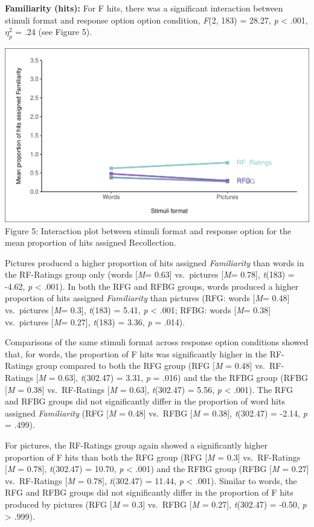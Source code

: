 \documentclass[
  11pt,
]{article}
\begin{document}
\textbf{Familiarity (hits):} For F hits, there was a significant
interaction between stimuli format and response option option condition,
\emph{F}(2, 183) = 28.27, \emph{p} \textless{} .001, \(\eta^2_p\) = .24
(see Figure 5).

\includegraphics{R--Thesis_files/figure-latex/unnamed-chunk-14-1.pdf}
Figure 5: Interaction plot between stimuli format and response option
for the mean proportion of hits assigned Recollection.

Pictures produced a higher proportion of hits assigned
\emph{Familiarity} than words in the RF-Ratings group only (words
{[}\emph{M}= 0.63{]} vs.~pictures {[}\emph{M}= 0.78{]}, \emph{t}(183) =
-4.62, \emph{p} \textless{} .001). In both the RFG and RFBG groups,
words produced a higher proportion of hits assigned \emph{Familiarity}
than pictures (RFG: words {[}\emph{M}= 0.48{]} vs.~pictures {[}\emph{M}=
0.3{]}, \emph{t}(183) = 5.41, \emph{p} \textless{} .001; RFBG: words
{[}\emph{M}= 0.38{]} vs.~pictures {[}\emph{M}= 0.27{]}, \emph{t}(183) =
3.36, \emph{p} = .014).

Comparisons of the same stimuli format across response option conditions
showed that, for words, the proportion of F hits was significantly
higher in the RF-Ratings group compared to both the RFG group (RFG
{[}\emph{M} = 0.48{]} vs.~RF-Ratings {[}\emph{M} = 0.63{]},
\emph{t}(302.47) = 3.31, \emph{p} = .016) and the the RFBG group (RFBG
{[}\emph{M} = 0.38{]} vs.~RF-Ratings {[}\emph{M} = 0.63{]},
\emph{t}(302.47) = 5.56, \emph{p} \textless{} .001). The RFG and RFBG
groups did not significantly differ in the proportion of word hits
assigned \emph{Familiarity} (RFG {[}\emph{M} = 0.48{]} vs.~RFBG
{[}\emph{M} = 0.38{]}, \emph{t}(302.47) = -2.14, \emph{p} = .499).

For pictures, the RF-Ratings group again showed a significantly higher
proportion of F hits than both the RFG group (RFG {[}\emph{M} = 0.3{]}
vs.~RF-Ratings {[}\emph{M} = 0.78{]}, \emph{t}(302.47) = 10.70, \emph{p}
\textless{} .001) and the RFBG group (RFBG {[}\emph{M} = 0.27{]}
vs.~RF-Ratings {[}\emph{M} = 0.78{]}, \emph{t}(302.47) = 11.44, \emph{p}
\textless{} .001). Similar to words, the RFG and RFBG groups did not
significantly differ in the proportion of F hits produced by pictures
(RFG {[}\emph{M} = 0.3{]} vs.~RFBG {[}\emph{M} = 0.27{]},
\emph{t}(302.47) = -0.50, \emph{p} \textgreater{} .999).
\end{document}
